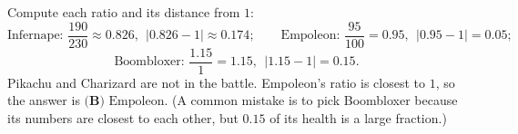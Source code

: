 Compute each ratio and its distance from $1$:
\[
\text{Infernape: }\dfrac{190}{230}\approx0.826,\ \ |0.826-1|\approx0.174;\qquad
\text{Empoleon: }\dfrac{95}{100}=0.95,\ \ |0.95-1|=0.05;
\]
\[
\text{Boombloxer: }\dfrac{1.15}{1}=1.15,\ \ |1.15-1|=0.15 .
\]
Pikachu and Charizard are not in the battle. Empoleon's ratio is closest to $1$, so the answer is $\boxed{\textbf{(B)}\text{ Empoleon}}$. (A common mistake is to pick Boombloxer because its numbers are closest to each other, but $0.15$ of its health is a large fraction.)
